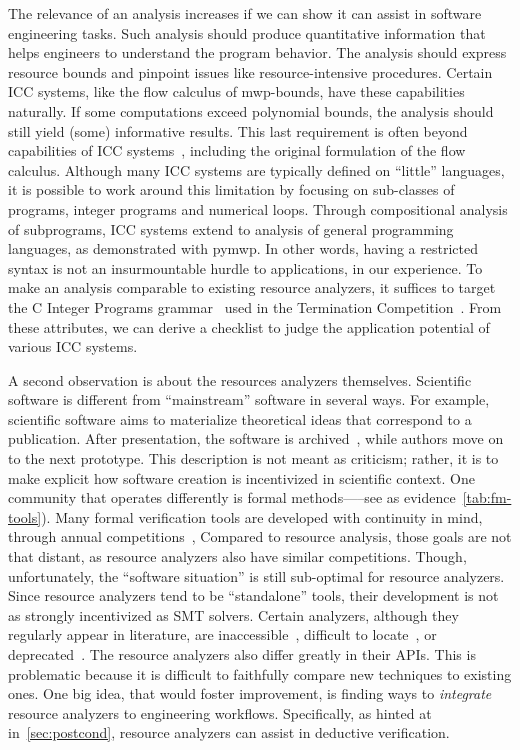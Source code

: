 The relevance of an analysis increases if we can show it can assist in software engineering tasks.
Such analysis should produce quantitative information that helps engineers to understand the program behavior.
The analysis should express resource bounds and pinpoint issues like resource-intensive procedures.
Certain ICC systems, like the flow calculus of mwp-bounds, have these capabilities naturally.
If some computations exceed polynomial bounds, the analysis should still yield (some) informative results.
This last requirement is often beyond capabilities of ICC systems~\cite{baillot2012}, including the original formulation of the flow calculus.
Although many ICC systems are typically defined on \enquote{little} languages, it is possible to work around this limitation by focusing on sub-classes of programs, \eg integer programs and numerical loops.
Through compositional analysis of subprograms, ICC systems extend to analysis of general programming languages, as demonstrated with pymwp.
In other words, having a restricted syntax is not an insurmountable hurdle to applications, in our experience.
To make an analysis comparable to existing resource analyzers, it suffices to target the C Integer Programs grammar~\cite{cinteger} used in the Termination Competition~\cite{giesl2019}.
From these attributes, we can derive a checklist to judge the application potential of various ICC systems. 

A second observation is about the resources analyzers themselves.
Scientific software is different from \enquote{mainstream} software in several ways.
For example, scientific software aims to materialize theoretical ideas that correspond to a publication.
After presentation, the software is archived~\cite{acm_badging}, while authors move on to the next prototype.
This description is not meant as criticism;
rather, it is to make explicit how software creation is incentivized in scientific context.
One community that operates differently is formal methods—--see as evidence~\autoref{tab:fm-tools}). 
Many formal verification tools are developed with continuity in mind, through annual competitions~\cite{casc,beyer2022}, \etc 
Compared to resource analysis, those goals are not that distant, as resource analyzers also have similar competitions.
Though, unfortunately, the \enquote{software situation} is still sub-optimal for resource analyzers.
Since resource analyzers tend to be \enquote{standalone} tools, their development is not as strongly incentivized as \eg SMT solvers. 
Certain analyzers, although they regularly appear in literature, are inaccessible~\cite{sinn2017}, difficult to locate~\cite{carbonneaux2015},
or deprecated~\cite{gulwani2009,srikanth2017}.
The resource analyzers also differ greatly in their APIs.
This is problematic because it is difficult to faithfully compare new techniques to existing ones.
One big idea, that would foster improvement, is finding ways to \emph{integrate} resource analyzers to engineering workflows.
Specifically, as hinted at in~\autoref{sec:postcond}, resource analyzers can assist in deductive verification.

